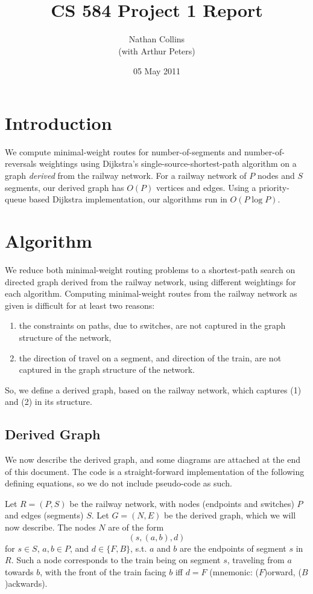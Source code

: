 \documentclass[11pt]{article}
\title{CS 584 Project 1 Report}
\author{Nathan Collins \\ (with Arthur Peters)}
\date{05 May 2011}
\begin{document}
\maketitle


\section{Introduction}
\label{sec-1}


We compute minimal-weight routes for number-of-segments and
number-of-reversals weightings using Dijkstra's
single-source-shortest-path algorithm on a graph \emph{derived} from the
railway network.  For a railway network of $P$ nodes and $S$ segments,
our derived graph has $O(P)$ vertices and edges. Using a
priority-queue based Dijkstra implementation, our algorithms run in
$O(P \log P)$.

\section{Algorithm}
\label{sec-2}


We reduce both minimal-weight routing problems to a shortest-path
search on directed graph derived from the railway network, using
different weightings for each algorithm.  Computing minimal-weight
routes from the railway network as given is difficult for at least two
reasons:

\begin{enumerate}
\item the constraints on paths, due to switches, are not captured in the
   graph structure of the network,
\item the direction of travel on a segment, and direction of the train,
   are not captured in the graph structure of the network.
\end{enumerate}
So, we define a derived graph, based on the railway network, which
captures (1) and (2) in its structure.

\subsection{Derived Graph}
\label{sec-2.1}


We now describe the derived graph, and some diagrams are attached at
the end of this document.  The code is a straight-forward
implementation of the following defining equations, so we do not
include pseudo-code as such.

Let $R = (P,S)$ be the railway network, with nodes (endpoints and
switches) $P$ and edges (segments) $S$. Let $G = (N,E)$ be the derived
graph, which we will now describe.  The nodes $N$ are of the form
\[
(s,(a,b),d)
\] for $s \in S$, $a, b \in P$, and $d \in \{F,B\}$, s.t. $a$ and $b$
are the endpoints of segment $s$ in $R$.  Such a node corresponds to
the train being on segment $s$, traveling from $a$ towards $b$, with
the front of the train facing $b$ iff $d = F$ (mnemonic: ($F$)orward,
($B$)ackwards).
\end{document}
